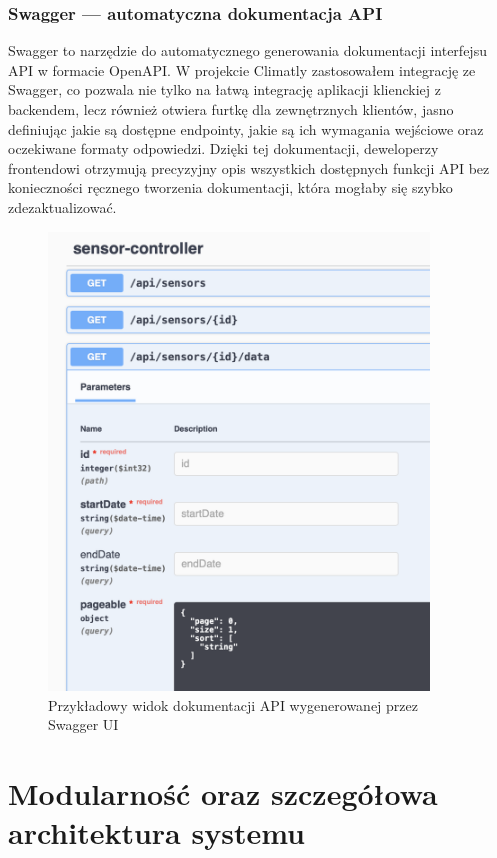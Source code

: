 \documentclass[a4paper,12pt,openany]{book}
\begin{document}
\subsection*{Swagger --- automatyczna dokumentacja API}

Swagger to narzędzie do automatycznego generowania dokumentacji interfejsu API w formacie OpenAPI. W projekcie Climatly zastosowałem integrację ze Swagger, co pozwala nie tylko na łatwą integrację aplikacji klienckiej z backendem, lecz również otwiera furtkę dla zewnętrznych klientów, jasno definiując jakie są dostępne endpointy, jakie są ich wymagania wejściowe oraz oczekiwane formaty odpowiedzi. Dzięki tej dokumentacji, deweloperzy frontendowi otrzymują precyzyjny opis wszystkich dostępnych funkcji API bez konieczności ręcznego tworzenia dokumentacji, która mogłaby się szybko zdezaktualizować.

\begin{figure}[H]
    \centering
    \includegraphics[width=0.9\textwidth]{swagger.png}
    \caption{Przykładowy widok dokumentacji API wygenerowanej przez Swagger UI}
    \label{fig:swagger-ui}
\end{figure}

\chapter{Modularność oraz szczegółowa architektura systemu}
\end{document}
